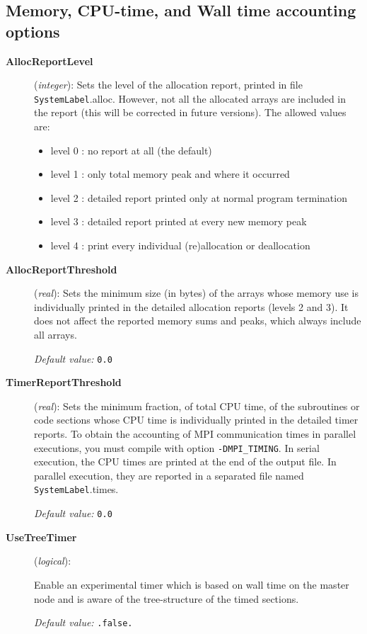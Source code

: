 \documentclass[11pt]{article}
\begin{document}
\subsection{Memory, CPU-time, and Wall time accounting options}
\begin{description}

\item[{\bf AllocReportLevel}] ({\it integer}):
Sets the level of the allocation report, printed in file
{\tt SystemLabel}.alloc. However, not all the allocated arrays are 
included in the report (this will be corrected in future versions).
The allowed values are:
\begin{itemize}
\item
  level 0 : no report at all (the default)
\item
  level 1 : only total memory peak and where it occurred
\item
  level 2 : detailed report printed only at
            normal program termination
\item
  level 3 : detailed report printed at every new memory peak
\item
  level 4 : print every individual (re)allocation or deallocation
\end{itemize}


\item[{\bf AllocReportThreshold}] ({\it real}): 
Sets the minimum size (in bytes) of the arrays whose memory use
is individually printed in the detailed allocation reports 
(levels 2 and 3). It does not affect the reported memory sums
and peaks, which always include all arrays.

{\it Default value:} {\tt 0.0}


\item[{\bf TimerReportThreshold}] ({\it real}): 
Sets the minimum fraction, of total CPU time, of the subroutines or
code sections whose CPU time is individually printed in the detailed 
timer reports. To obtain the accounting of MPI communication times
in parallel executions, you must compile with option {\tt -DMPI\_TIMING}.
In serial execution, the CPU times are printed at the end of the
output file. In parallel execution, they are reported in a separated
file named {\tt SystemLabel}.times.

{\it Default value:} {\tt 0.0}

\item[{\bf UseTreeTimer}] ({\it logical}): 

Enable an experimental timer which is based on wall time on the master
node and is aware of the tree-structure of the timed sections.

{\it Default value:} {\tt .false.}


\end{description}
\end{document}
